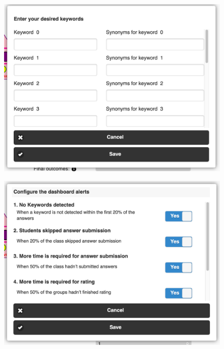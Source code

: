 \begin{figure}[!h]
    \includegraphics[clip,width=\columnwidth]{Figures/pyramidapp4.png}%
\caption{}
\label{fig:P4}
\end{figure}
\begin{figure}[!h]
    \includegraphics[clip,width=\columnwidth]{Figures/pyramidapp5.png}%
\caption{}
\label{fig:P5}
\end{figure}
